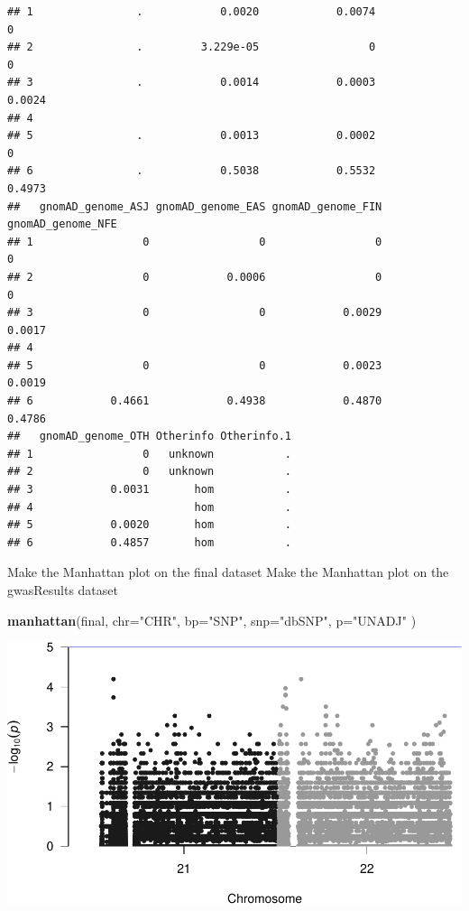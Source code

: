 \documentclass[
]{article}
\newenvironment{Shaded}{\begin{snugshade}}{\end{snugshade}}
\newcommand{\DataTypeTok}[1]{\textcolor[rgb]{0.13,0.29,0.53}{#1}}
\newcommand{\KeywordTok}[1]{\textcolor[rgb]{0.13,0.29,0.53}{\textbf{#1}}}
\newcommand{\NormalTok}[1]{#1}
\newcommand{\StringTok}[1]{\textcolor[rgb]{0.31,0.60,0.02}{#1}}
\begin{document}
\begin{verbatim}
## 1                .            0.0020            0.0074                 0
## 2                .         3.229e-05                 0                 0
## 3                .            0.0014            0.0003            0.0024
## 4                                                                       
## 5                .            0.0013            0.0002                 0
## 6                .            0.5038            0.5532            0.4973
##   gnomAD_genome_ASJ gnomAD_genome_EAS gnomAD_genome_FIN gnomAD_genome_NFE
## 1                 0                 0                 0                 0
## 2                 0            0.0006                 0                 0
## 3                 0                 0            0.0029            0.0017
## 4                                                                        
## 5                 0                 0            0.0023            0.0019
## 6            0.4661            0.4938            0.4870            0.4786
##   gnomAD_genome_OTH Otherinfo Otherinfo.1
## 1                 0   unknown           .
## 2                 0   unknown           .
## 3            0.0031       hom           .
## 4                         hom           .
## 5            0.0020       hom           .
## 6            0.4857       hom           .
\end{verbatim}

Make the Manhattan plot on the final dataset Make the Manhattan plot on
the gwasResults dataset

\begin{Shaded}
\begin{Highlighting}[]
\KeywordTok{manhattan}\NormalTok{(final, }\DataTypeTok{chr=}\StringTok{"CHR"}\NormalTok{, }\DataTypeTok{bp=}\StringTok{"SNP"}\NormalTok{, }\DataTypeTok{snp=}\StringTok{"dbSNP"}\NormalTok{, }\DataTypeTok{p=}\StringTok{"UNADJ"}\NormalTok{ )}
\end{Highlighting}
\end{Shaded}

\includegraphics{GWASvisualizations_files/figure-latex/unnamed-chunk-10-1.pdf}
\end{document}
